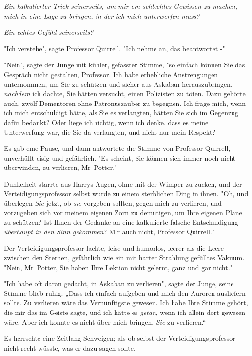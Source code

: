 {\emph{Ein kalkulierter Trick seinerseits, um mir ein schlechtes Gewissen zu machen, mich in eine Lage zu bringen, in der ich mich unterwerfen muss?}

\emph{Ein echtes Gefühl seinerseits?}

"Ich verstehe", sagte Professor Quirrell. "Ich nehme an, das beantwortet -"

"Nein", sagte der Junge mit kühler, gefasster Stimme, "so einfach können Sie das Gespräch nicht gestalten, Professor. Ich habe erhebliche Anstrengungen unternommen, um Sie zu schützen und sicher aus Askaban herauszubringen, \emph{nachdem} ich dachte, Sie hätten versucht, einen Polizisten zu töten. Dazu gehörte auch, zwölf Dementoren ohne Patronuszauber zu begegnen. Ich frage mich, wenn ich mich entschuldigt hätte, als Sie es verlangten, hätten Sie sich im Gegenzug dafür bedankt? Oder liege ich richtig, wenn ich denke, dass es meine Unterwerfung war, die Sie da verlangten, und nicht nur mein Respekt?

Es gab eine Pause, und dann antwortete die Stimme von Professor Quirrell, unverhüllt eisig und gefährlich. "Es scheint, Sie können sich immer noch nicht überwinden, zu verlieren, Mr~Potter."

Dunkelheit starrte aus Harrys Augen, ohne mit der Wimper zu zucken, und der Verteidigungsprofessor selbst wurde zu einem sterblichen Ding in ihnen. "Oh, und überlegen \emph{Sie} jetzt, ob \emph{sie} vorgeben sollten, gegen mich zu verlieren, und vorzugeben sich vor meinem eigenen Zorn zu demütigen, um Ihre eigenen Pläne zu schützen? Ist Ihnen der Gedanke an eine kalkulierte falsche Entschuldigung \emph{überhaupt in den Sinn gekommen}? Mir auch nicht, Professor Quirrell."

Der Verteidigungsprofessor lachte, leise und humorlos, leerer als die Leere zwischen den Sternen, gefährlich wie ein mit harter Strahlung gefülltes Vakuum. "Nein, Mr~Potter, Sie haben Ihre Lektion nicht gelernt, ganz und gar nicht."

"Ich habe oft daran gedacht, in Askaban zu verlieren", sagte der Junge, seine Stimme blieb ruhig. „Dass ich einfach aufgeben und mich den Auroren ausliefern sollte. Zu verlieren wäre das Vernünftigste gewesen. Ich habe Ihre Stimme gehört, die mir das im Geiste sagte, und ich hätte es \emph{getan}, wenn ich allein dort gewesen wäre. Aber ich konnte es nicht über mich bringen, \emph{Sie} zu verlieren.“

Es herrschte eine Zeitlang Schweigen; als ob selbst der Verteidigungsprofessor nicht recht wüsste, was er dazu sagen sollte.

}

